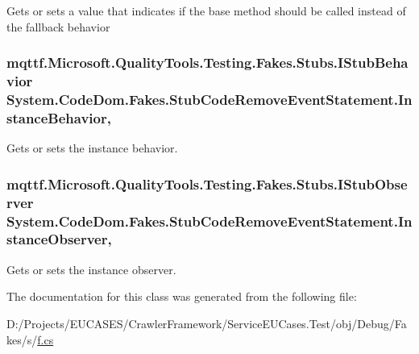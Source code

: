 Gets or sets a value that indicates if the base method should be called instead of the fallback behavior

\hypertarget{class_system_1_1_code_dom_1_1_fakes_1_1_stub_code_remove_event_statement_ad917b15875492c370e4866310ca4da5b}{
\subsubsection[{Instance\-Behavior}]{\setlength{\rightskip}{0pt plus 5cm}mqttf.\-Microsoft.\-Quality\-Tools.\-Testing.\-Fakes.\-Stubs.\-I\-Stub\-Behavior System.\-Code\-Dom.\-Fakes.\-Stub\-Code\-Remove\-Event\-Statement.\-Instance\-Behavior\hspace{0.3cm}{\ttfamily [get]}, {\ttfamily [set]}}}\label{class_system_1_1_code_dom_1_1_fakes_1_1_stub_code_remove_event_statement_ad917b15875492c370e4866310ca4da5b}


Gets or sets the instance behavior.

\hypertarget{class_system_1_1_code_dom_1_1_fakes_1_1_stub_code_remove_event_statement_a12ecb206c5be142eb11188301603d2e0}{
\subsubsection[{Instance\-Observer}]{\setlength{\rightskip}{0pt plus 5cm}mqttf.\-Microsoft.\-Quality\-Tools.\-Testing.\-Fakes.\-Stubs.\-I\-Stub\-Observer System.\-Code\-Dom.\-Fakes.\-Stub\-Code\-Remove\-Event\-Statement.\-Instance\-Observer\hspace{0.3cm}{\ttfamily [get]}, {\ttfamily [set]}}}\label{class_system_1_1_code_dom_1_1_fakes_1_1_stub_code_remove_event_statement_a12ecb206c5be142eb11188301603d2e0}


Gets or sets the instance observer.



The documentation for this class was generated from the following file\-:\begin{DoxyCompactItemize}
\item 
D\-:/\-Projects/\-E\-U\-C\-A\-S\-E\-S/\-Crawler\-Framework/\-Service\-E\-U\-Cases.\-Test/obj/\-Debug/\-Fakes/s/\hyperlink{s_2f_8cs}{f.\-cs}\end{DoxyCompactItemize}
